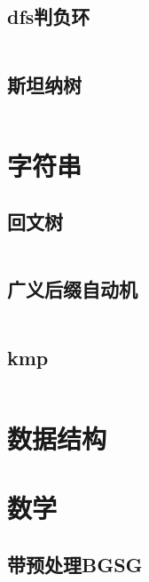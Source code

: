 \documentclass[a4paper,11pt]{article}
\begin{document}
\subsection{dfs判负环}
\inputminted[breaklines]{c++}{Graph/dfs判负环.cpp}

\subsection{斯坦纳树}
\inputminted[breaklines]{c++}{Graph/斯坦纳树.cpp}







\newpage
\section{字符串}

\subsection{回文树}
\inputminted[breaklines]{c++}{String/pam.cpp}

\subsection{广义后缀自动机}
\inputminted[breaklines]{c++}{String/sam.cpp}

\subsection{kmp}
\inputminted[breaklines]{c++}{String/kmp.cpp}


\newpage
\section{数据结构}











\newpage
\section{数学} %

\subsection{带预处理BGSG}
\inputminted[breaklines]{c++}{Math/BGSG.cpp}
\end{document}
